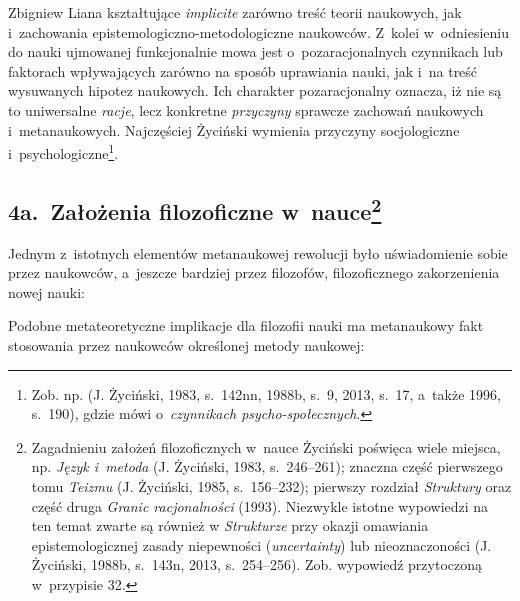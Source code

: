 \begin{artplenv}{Zbigniew Liana}
kształtujące \textit{implicite} zarówno treść teorii naukowych, jak i~zachowania epistemologiczno-metodologiczne
naukowców. Z~kolei w~odniesieniu do nauki ujmowanej funkcjonalnie mowa jest o~pozaracjonalnych czynnikach lub faktorach
wpływających zarówno na sposób uprawiania nauki, jak i~na treść wysuwanych hipotez naukowych. Ich charakter
pozaracjonalny oznacza, iż nie są to uniwersalne\textit{ racje}, lecz konkretne \textit{przyczyny} sprawcze zachowań
naukowych i~metanaukowych. Najczęściej Życiński wymienia przyczyny socjologiczne i~psychologiczne\footnote{Zob. np. 
\label{ref:RNDijWA45P0nD}(J. Życiński, 1983, s.~142nn, 1988b, s.~9, 2013, s.~17,  a~także 1996, s.~190), gdzie
mówi o~\textit{czynnikach psycho-społecznych}.}.

\subsection{4a.~Założenia filozoficzne w~nauce\footnote{Zagadnieniu założeń filozoficznych w~nauce Życiński poświęca wiele miejsca,
np. \textit{Język i~metoda} \label{ref:RNDXAivjQttgc}(J. Życiński, 1983, s.~246–261); znaczna część pierwszego tomu
\textit{Teizmu} \label{ref:RND6qvog2NMv7}(J. Życiński, 1985, s.~156–232); pierwszy rozdział \textit{Struktury} oraz część
druga \textit{Granic racjonalności} (1993). Niezwykle istotne wypowiedzi na ten temat zwarte są również w
\textit{Strukturze} przy okazji omawiania epistemologicznej zasady niepewności (\textit{uncertainty}) lub nieoznaczoności
\label{ref:RND7zd8YYNkba}(J. Życiński, 1988b, s.~143n, 2013, s.~254–256). Zob. wypowiedź przytoczoną w~przypisie 32.}}

Jednym z~istotnych elementów metanaukowej rewolucji było uświadomienie sobie przez naukowców, a~jeszcze bardziej przez
filozofów, filozoficznego zakorzenienia nowej nauki:

Podobne metateoretyczne implikacje dla filozofii nauki ma metanaukowy fakt stosowania przez naukowców określonej metody
naukowej: 


\end{artplenv}
